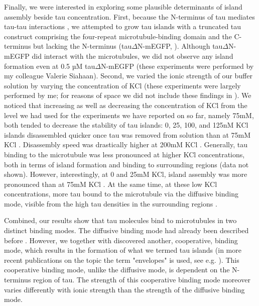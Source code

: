 Finally, we were interested in exploring some plausible determinants of island assembly beside tau concentration. First, because the N-terminus of tau mediates tau-tau interactions \parencite{Gamblin2003}, we attempted to grow tau islands with a truncated tau construct comprising the four-repeat microtubule-binding domain and the C-terminus but lacking the N-terminus (tau$\Delta$N-mEGFP, ). Although tau$\Delta$N-mEGFP did interact with the microtubules, we did not observe any island formation even at 0.5 µM tau$\Delta$N-mEGFP (these experiments were performed by my colleague Valerie Siahaan). Second, we varied the ionic strength of our buffer solution by varying the concentration of KCl (these experiments were largely performed by me; for reasons of space we did not include these findings in \cite{Siahaan2019a}). We noticed that increasing as well as decreasing the concentration of KCl from the level we had used for the experiments we have reported on so far, namely 75mM, both tended to decrease the stability of tau islands: 0, 25, 100, and 125nM KCl islands disassembled quicker once tau was removed from solution than at 75mM KCl . Disassembly speed was drastically higher at 200mM KCl . Generally, tau binding to the microtubule was less pronounced at higher KCl concentrations, both in terms of island formation and binding to surrounding regions (data not shown). However, interestingly, at 0 and 25mM KCl, island assembly was more pronounced than at 75mM KCl . At the same time, at these low KCl concentrations, more tau bound to the microtubule via the diffusive binding mode, visible from the high tau densities in the surrounding regions .\par

Combined, our results show that tau molecules bind to microtubules in two distinct binding modes. The diffusive binding mode had already been described before \parencite{Hinrichs2012b}. However, we together with \cite{tan2019microtubules} discovered another, cooperative, binding mode, which results in the formation of what we termed tau islands (in more recent publications on the topic the term "envelopes" is used, see e.g. \cite{siahaan2022microtubule}). This cooperative binding mode, unlike the diffusive mode, is dependent on the N-terminus region of tau. The strength of this cooperative binding mode moreover varies differently with ionic strength than the strength of the diffusive binding mode.
